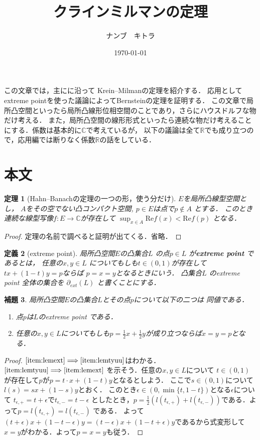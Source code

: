 \documentclass[leqno, a4paper, 12pt]{jsarticle}
\title{クラインミルマンの定理}
\author{ナンブ　キトラ}
\date{\today}
\newtheorem{thm}{定理}
\newtheorem{lem}[thm]{補題}
\newtheorem{df}[thm]{定義}
\newcommand{\To}{\Longrightarrow}
\newcommand{\rr}{\mathbb{R}}
\newcommand{\cc}{\mathbb{C}}
\newcommand{\myre}{\mathrm{Re}}
\newcommand{\myextreme}[1]{\partial_{ext}(#1)}
\begin{document}
\maketitle




この文章では，主に\cite{phe}に沿って
Krein--Milmanの定理を紹介する．
応用としてextreme pointを使った議論によってBernsteinの定理を証明する．
この文章で局所凸空間といったら局所凸線形位相空間のことであり，さらにハウスドルフな物だけ考える．
また，局所凸空間の線形形式といったら連続な物だけ考えることにする．係数は基本的に$\cc$で考えているが，
以下の議論は全て$\rr$でも成り立つので，応用編では断りなく係数$\rr$の話をしている．
\section{本文}
\begin{thm}[Hahn--Banachの定理の一つの形，使う分だけ]\label{thm:hbhb}
$E$を局所凸線型空間とし，
$A$をその空でない凸コンパクト空間,
$p\in E$は点で$p\not \in A$
とする．
このとき連続な線型写像$f\colon E\to \cc$が存在して
$\sup_{x\in A}\myre f(x)<\myre f(p)$
となる．
\end{thm}
\begin{proof}
定理の名前で調べると証明が出てくる．省略．
\end{proof}



\begin{df}[extreme point]
局所凸空間$E$の凸集合$L$
の点$p\in L$
が\textbf{extreme point}
であるとは，
任意の$x, y\in L$
についてもしも$t\in (0, 1)$が存在して
$tx+(1-t)y=p$ならば
$p=x=y$となるときにいう．
凸集合$L$
のextreme point 全体の集合を
$\myextreme{L}$
と書くことにする．
\end{df}

\begin{lem}
局所凸空間$E$の凸集合$L$とその点$p$について以下の二つは
同値である．
\begin{enumerate}[label=\textup{(\arabic*)}]
\item\label{item:lemext} 点$p$は$L$のextreme point である．

\item\label{item:lemtyuu}
任意の$x, y\in L$についてもしも$p=\frac{1}{2}x+\frac{1}{2}y$が成り立つならば$x=y=p$となる．
\end{enumerate}
\end{lem}
\begin{proof}
$\ref{item:lemext}\To \ref{item:lemtyuu}$はわかる．
$\ref{item:lemtyuu}\To \ref{item:lemext}$
を示そう．任意の$x, y\in L$について
$t\in (0, 1)$が存在して$p$が$p=t\cdot x+(1-t)y$となるとしよう．
ここで$s\in (0, 1)$について$l(s)=sx+(1-s)y$とおく．
このとき$\epsilon\in (0, \min\{t, 1-t\})$となる$\epsilon$について
$t_{\epsilon, +}=t+\epsilon$で$t_{\epsilon, -}=t-\epsilon$
としたとき，$p=\frac{1}{2}(l(t_{\epsilon, +})+l(t_{\epsilon, -}))$である．よって$p=l(t_{\epsilon, +})=l(t_{\epsilon, -})$
である．
よって$(t+\epsilon)x+(1-t-\epsilon)y=(t-\epsilon)x+(1-t+\epsilon)y$であるから式変形して
$x=y$がわかる．よって$p=x=y$も従う．
\end{proof}
\end{document}
